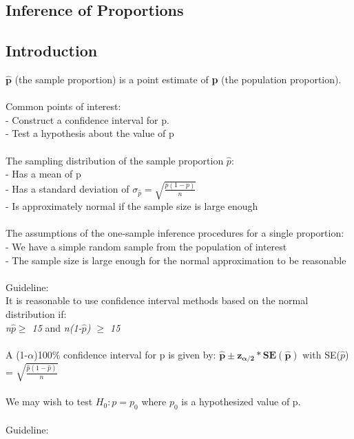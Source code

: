 \documentclass[12pt, a4paper]{article}
\begin{document}
\begin{center} \section{Inference of Proportions} \end{center}
	\subsection{Introduction}
	$\bm{\hat{p}}$ (the sample proportion) is a point estimate of \textbf{p} (the population proportion). \\~\\
	Common points of interest: \\
	- Construct a confidence interval for p. \\
	- Test a hypothesis about the value of p \\~\\
	The sampling distribution of the sample proportion $\hat{p}$: \\
	- Has a mean of p \\
	- Has a standard deviation of $\sigma_{\hat{p}} = \sqrt{\frac{p(1-p)}{n}}$ \\
	- Is approximately normal if the sample size is large enough \\~\\
	The assumptions of the one-sample inference procedures for a single proportion: \\
	- We have a  simple random sample from the population of interest \\
	- The sample size is large enough for the normal approximation to be reasonable \\~\\
	Guideline: \\
	It is reasonable to use confidence interval methods based on the normal distribution if: \\
	\textit{n$\hat{p} \geq$ 15} and \textit{n(1-$\hat{p}$) $\geq$ 15} \\~\\
	A (1-$\alpha$)100\% confidence interval for p is given by: $\bm{\hat{p} \pm z_{\alpha/2} * SE(\hat{p})}$ with SE($\hat{p}$) = $\sqrt{\frac{\hat{p}(1-\hat{p})}{n}}$ \\~\\
	We may wish to test $H_0: p = p_0$ where $p_0$ is a hypothesized value of p. \\~\\
	Guideline: \\
\end{document}
